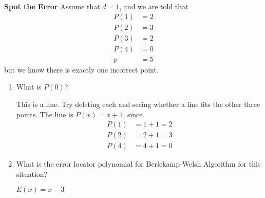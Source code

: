 \question \textbf{Spot the Error}\newline
Assume that $d = 1$, and we are told that 
\begin{equation}
\begin{split}
P(1) &= 2 \\
P(2) &= 3 \\
P(3) &= 2 \\
P(4) &= 0  \\
p &= 5
\end{split}
\end{equation}
but we know there is exactly one incorrect point. 
\begin{enumerate}[label=(\alph*)]
\item What is $P(0)$? 
\begin{solution}
This is a line. Try deleting each and seeing whether a line fits the other three points. The line is $P(x) = x+1$, since 
\begin{equation}
\begin{split}
P(1) &= 1+1 = 2 \\
P(2) &= 2+1 = 3 \\
P(4) &= 4+1 = 0
\end{split}
\end{equation}
\end{solution}

\item What is the error locator polynomial for Berlekamp-Welsh Algorithm for this situation?
\begin{solution}
$E(x) = x-3$
\end{solution}

\end{enumerate}